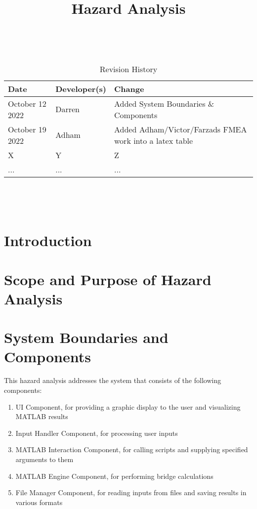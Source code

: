 \documentclass{article}
\title{Hazard Analysis\\\progname}
\author{\authname}
\date{}
\begin{document}
\maketitle
\thispagestyle{empty}

~\newpage


\begin{table}[hp]
\caption{Revision History} \label{TblRevisionHistory}
\begin{tabularx}{\textwidth}{llX}
\toprule
\textbf{Date} & \textbf{Developer(s)} & \textbf{Change}\\
\midrule
October 12 2022 & Darren & Added System Boundaries \& Components\\
October 19 2022& Adham & Added Adham/Victor/Farzads FMEA work into a latex table\\
X & Y & Z\\
... & ... & ...\\
\bottomrule
\end{tabularx}
\end{table}

~\newpage

\tableofcontents

~\newpage



\section{Introduction}


\section{Scope and Purpose of Hazard Analysis}

\section{System Boundaries and Components}

This hazard analysis addresses the system that consists of the following components:

\begin{enumerate}
	\item UI Component, for providing a graphic display to the user and visualizing MATLAB results
	\item Input Handler Component, for processing user inputs
	\item MATLAB Interaction Component, for calling scripts and supplying specified arguments to them
	\item MATLAB Engine Component, for performing bridge calculations
	\item File Manager Component, for reading inputs from files and saving results in various formats
\end{enumerate}
\end{document}
